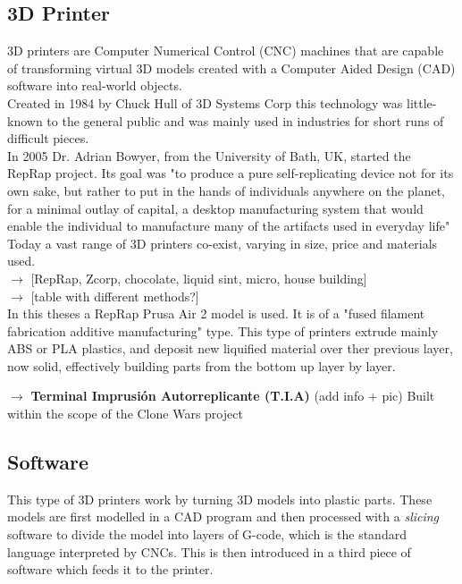 \subsection{3D Printer}

	3D printers are Computer Numerical Control (CNC) machines that are capable of transforming virtual 3D models created with a Computer Aided Design (CAD) software into real-world objects.\\

	Created in 1984 by Chuck Hull of 3D Systems Corp this technology was little-known to the general public and was mainly used in industries for short runs of difficult pieces.\\
	In 2005 Dr. Adrian Bowyer, from the University of Bath, UK, started the RepRap project. Its goal was "to produce a pure self-replicating device not for its own sake, but rather to put in the hands of individuals anywhere on the planet, for a minimal outlay of capital, a desktop manufacturing system that would enable the individual to manufacture many of the artifacts used in everyday life" \\

	Today a vast range of 3D printers co-exist, varying in size, price and materials used. \\


	$\rightarrow$ [RepRap, Zcorp, chocolate, liquid sint, micro, house building]\\

	$\rightarrow$ [table with different methods?]\\

	In this theses a RepRap Prusa Air 2 model is used. It is of a "fused filament fabrication additive manufacturing" type. This type of printers extrude mainly ABS or PLA plastics, and deposit new liquified material over ther previous layer, now solid, effectively building parts from the bottom up layer by layer.

	$\rightarrow$ \textbf {Terminal Imprusión Autorreplicante (T.I.A) }
	(add info + pic)
	Built within the scope of the Clone Wars project



\subsection{Software}
	This type of 3D printers work by turning 3D models into plastic parts. These models are first modelled in a CAD program and then processed with a \textit{slicing} software to divide the model into layers of G-code, which is the standard language interpreted by CNCs. This is then introduced in a third piece of software which feeds it to the printer.

